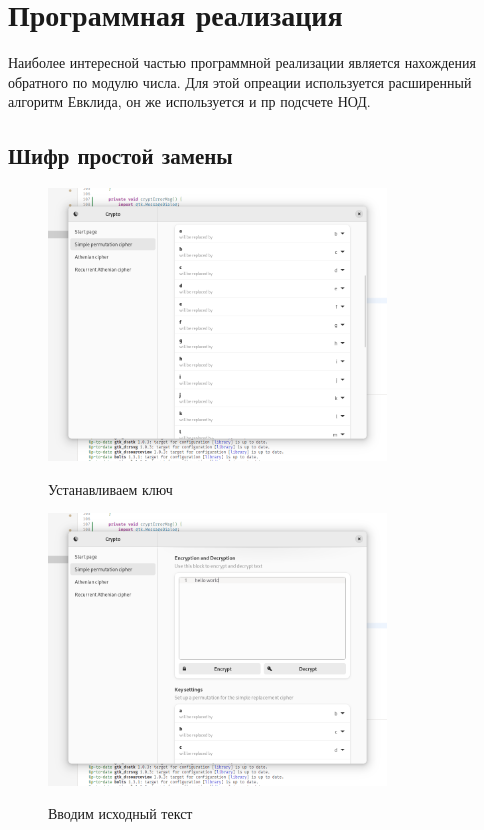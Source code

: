 \documentclass[a4paper]{article}
\begin{document}
  \newpage

  \section{Программная реализация}

  Наиболее интересной частью программной реализации является нахождения обратного
  по модулю числа. Для этой опреации используется расширенный алгоритм Евклида,
  он же используется и пр подсчете НОД.

  \subsection{Шифр простой замены}

  \begin{figure}[H]  
    \centering
    \caption{Устанавливаем ключ}
    \includegraphics[width=0.8\textwidth]{01_0001}
    \label{img:0001}
  \end{figure}

  \begin{figure}[H]  
    \centering
    \caption{Вводим исходный текст}
    \includegraphics[width=0.8\textwidth]{01_0003}
    \label{img:0003}
  \end{figure}
\end{document}

